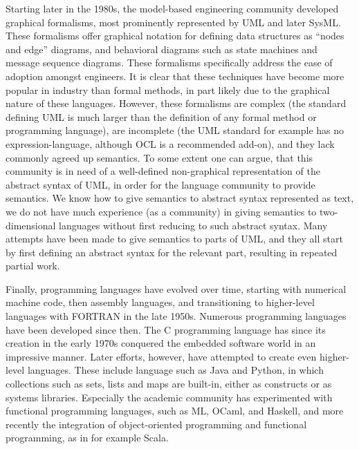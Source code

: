 Starting later in the 1980s, the model-based 
engineering community developed graphical formalisms, most 
prominently represented by UML and later SysML. These formalisms 
offer graphical notation for defining data structures as ``nodes 
and edge'' diagrams, and behavioral diagrams such as state machines 
and message sequence diagrams. These formalisms specifically 
address the ease of adoption amongst engineers. It is clear that
these techniques have become more popular in industry than formal 
methods, in part likely due to the graphical nature of 
these languages. However, these formalisms are complex (the 
standard defining UML is much larger than the definition of any 
formal method or programming language), are incomplete (the UML
standard for example has no expression-language, although OCL is
a recommended add-on), and they lack commonly agreed up semantics. 
To some extent one can argue, that this community is in need of a 
well-defined non-graphical representation of the abstract syntax
of UML, in order for the language community to provide 
semantics. We know how to give semantics to abstract syntax
represented as text, we do not have much experience (as a community) in giving semantics to two-dimensional languages without first reducing to such abstract syntax.
%
Many attempts have been made to give semantics to parts of UML,
and they all start by first defining an abstract syntax for the
relevant part, resulting in repeated partial work.

Finally, programming languages have evolved over time, starting 
with numerical machine code, then assembly languages, and 
transitioning to higher-level languages with FORTRAN in the late 
1950s. Numerous programming languages have been developed since 
then. The C programming language has  since its creation in the 
early 1970s conquered the embedded software world in an 
impressive manner. Later efforts, however, have attempted to
create even higher-level languages. These include language such as
Java and Python, in which collections such as sets, lists and maps 
are built-in, either as constructs or as systems libraries. 
Especially the academic community has experimented with functional 
programming languages, such as ML, OCaml, and Haskell, and more 
recently the integration of object-oriented programming and 
functional programming, as in for example Scala.

